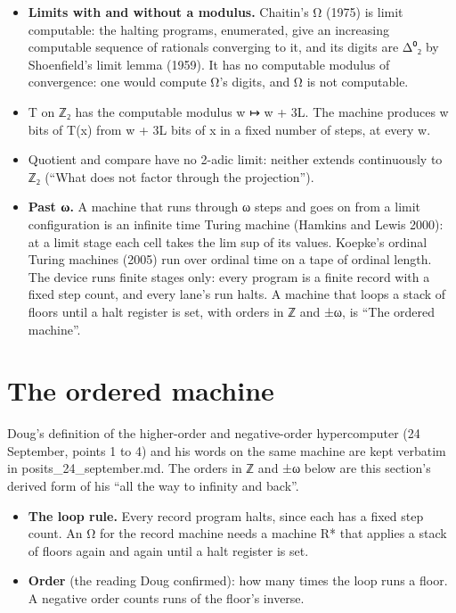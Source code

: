 \begin{itemize}
\item \textbf{Limits with and without a modulus.} Chaitin's Ω (1975) is limit computable: the halting programs, enumerated, give an increasing computable sequence of rationals converging to it, and its digits are Δ⁰₂ by Shoenfield's limit lemma (1959). It has no computable modulus of convergence: one would compute Ω's digits, and Ω is not computable.
\item T on ℤ₂ has the computable modulus w ↦ w + 3L. The machine produces w bits of T(x) from w + 3L bits of x in a fixed number of steps, at every w.
\item Quotient and compare have no 2-adic limit: neither extends continuously to ℤ₂ (“What does not factor through the projection”).
\item \textbf{Past ω.} A machine that runs through ω steps and goes on from a limit configuration is an infinite time Turing machine (Hamkins and Lewis 2000): at a limit stage each cell takes the lim sup of its values. Koepke's ordinal Turing machines (2005) run over ordinal time on a tape of ordinal length. The device runs finite stages only: every program is a finite record with a fixed step count, and every lane's run halts. A machine that loops a stack of floors until a halt register is set, with orders in ℤ and ±ω, is “The ordered machine”.
\end{itemize}

\section{\texorpdfstring{The ordered machine}{The ordered machine}}

Doug's definition of the higher-order and negative-order hypercomputer (24 September, points 1 to 4) and his words on the same machine are kept verbatim in posits\_\allowbreak{}24\_\allowbreak{}september.md. The orders in ℤ and ±ω below are this section's derived form of his “all the way to infinity and back”.

\begin{itemize}
\item \textbf{The loop rule.} Every record program halts, since each has a fixed step count. An Ω for the record machine needs a machine R* that applies a stack of floors again and again until a halt register is set.
\item \textbf{Order} (the reading Doug confirmed): how many times the loop runs a floor. A negative order counts runs of the floor's inverse.
\end{itemize}

